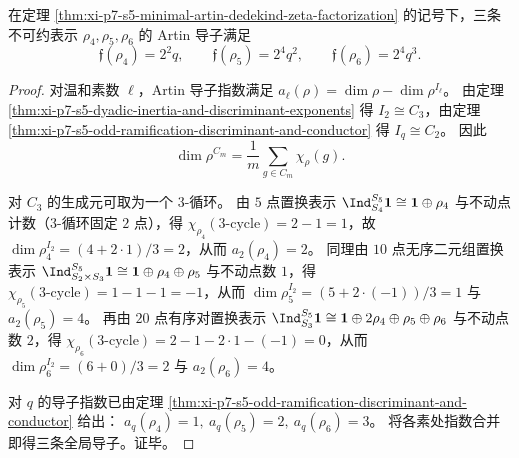 \begin{theorem}\label{thm:xi-p7-s5-global-artin-conductors-rho456}
在定理 \ref{thm:xi-p7-s5-minimal-artin-dedekind-zeta-factorization} 的记号下，三条不可约表示 \(\rho_4,\rho_5,\rho_6\) 的 Artin 导子满足
\[
\mathfrak f(\rho_4)=2^{2}q,\qquad
\mathfrak f(\rho_5)=2^{4}q^{2},\qquad
\mathfrak f(\rho_6)=2^{4}q^{3}.
\]
\end{theorem}
\begin{proof}
对温和素数 \(\ell\)，Artin 导子指数满足
\(
a_\ell(\rho)=\dim\rho-\dim\rho^{I_\ell}
\)。
由定理 \ref{thm:xi-p7-s5-dyadic-inertia-and-discriminant-exponents} 得 \(I_2\cong C_3\)，由定理 \ref{thm:xi-p7-s5-odd-ramification-discriminant-and-conductor} 得 \(I_q\cong C_2\)。
因此
\[
\dim \rho^{C_m}=\frac1m\sum_{g\in C_m}\chi_\rho(g).
\]
\par
对 \(C_3\) 的生成元可取为一个 \(3\)-循环。
由 \(5\) 点置换表示 \(\Ind_{S_4}^{S_5}\mathbf 1\cong \mathbf 1\oplus\rho_4\) 与不动点计数（\(3\)-循环固定 \(2\) 点），得
\(\chi_{\rho_4}(3\text{-cycle})=2-1=1\)，故
\(
\dim\rho_4^{I_2}=(4+2\cdot 1)/3=2
\)，从而 \(a_2(\rho_4)=2\)。
同理由 \(10\) 点无序二元组置换表示 \(\Ind_{S_2\times S_3}^{S_5}\mathbf 1\cong \mathbf 1\oplus\rho_4\oplus\rho_5\) 与不动点数 \(1\)，得
\(\chi_{\rho_5}(3\text{-cycle})=1-1-1=-1\)，从而
\(
\dim\rho_5^{I_2}=(5+2\cdot(-1))/3=1
\) 与 \(a_2(\rho_5)=4\)。
再由 \(20\) 点有序对置换表示 \(\Ind_{S_3}^{S_5}\mathbf 1\cong \mathbf 1\oplus 2\rho_4\oplus\rho_5\oplus\rho_6\) 与不动点数 \(2\)，得
\(\chi_{\rho_6}(3\text{-cycle})=2-1-2\cdot 1-(-1)=0\)，从而
\(
\dim\rho_6^{I_2}=(6+0)/3=2
\) 与 \(a_2(\rho_6)=4\)。
\par
对 \(q\) 的导子指数已由定理 \ref{thm:xi-p7-s5-odd-ramification-discriminant-and-conductor} 给出：
\(
a_q(\rho_4)=1,\ a_q(\rho_5)=2,\ a_q(\rho_6)=3
\)。
将各素处指数合并即得三条全局导子。证毕。
\end{proof}

